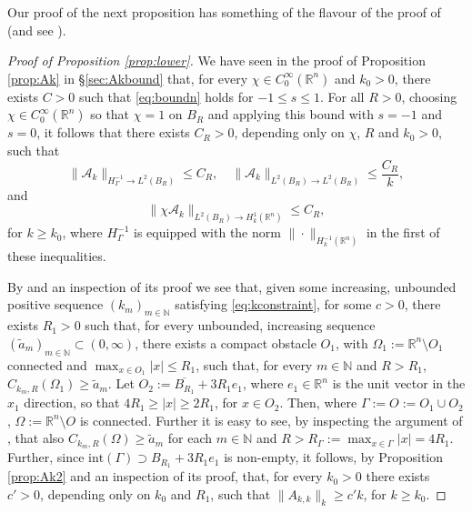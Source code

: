 \documentclass{birkjour}
\theoremstyle{definition}
\theoremstyle{remark}
\numberwithin{equation}{section}
\newcommand{\R}{\mathbb{R}}
\newcommand{\N}{\mathbb{N}}
\newcommand{\cA}{\mathcal{A}}
\begin{document}
Our proof of the next proposition has something of the flavour of the proof of \cite[Theorem 2.8]{BetCha11} (and see \cite[pp.~222--223]{chandler2012numerical}).
\begin{proof}[Proof of Proposition \ref{prop:lower}] We have seen in the proof of Proposition \ref{prop:Ak} in \S\ref{sec:Akbound} that, for every $\chi\in C_0^\infty(\R^n)$ and $k_0>0$, there exists $C>0$ such that \eqref{eq:boundn} holds for $-1\leq s\leq 1$. For all $R>0$,  choosing $\chi\in C^\infty_{0}(\R^n)$ so that $\chi=1$ on $B_R$ and applying this bound with $s=-1$ and $s=0$, it follows that there exists $C_R>0$, depending only on $\chi$, $R$ and $k_0>0$, such that
\begin{equation} \label{eq:Akbounds}
\|\cA_k\|_{H_\Gamma^{-1}\to L^2(B_R)} \leq C_R, \quad \|\cA_k\|_{L^2(B_R)\to L^2(B_R)} \leq \frac{C_R}{k}, 
\end{equation}
and
\begin{equation} \label{eq:Akbounds2}
\|\chi \cA_k\|_{L^2(B_R)\to H_k^1(\R^n)} \leq C_R,
\end{equation}
for $k\geq k_0$, where $H_\Gamma^{-1}$ is equipped with the norm $\|\cdot\|_{H^{-1}_k(\R^n)}$ in the first of these inequalities.


 By \cite[Theorem 1.4]{SiavashSimon0} and an inspection of its proof we see that, given some increasing, unbounded positive sequence $(k_m)_{m\in \N}$  satisfying \eqref{eq:kconstraint}, for some $c>0$, there exists $R_1>0$ such that, for every unbounded, increasing sequence $(\tilde a_m)_{m\in \N}\subset (0,\infty)$, there exists a compact obstacle $O_1$, with $\Omega_1:= \R^n\setminus O_1$ connected and $\max_{x\in O_1}|x|\leq R_1$, such that, for every $m\in \N$ and $R>R_1$,
$
C_{k_m,R}(\Omega_1) \geq \tilde a_m.
$
Let $O_2:= \overline{B_{R_1}} + 3R_1e_1$, where $e_1\in \R^n$ is the unit vector in the $x_1$ direction, so that $4R_1\geq |x| \geq  2R_1$, for $x\in O_2$. Then, where  $\Gamma := O:= O_1\cup O_2$, $\Omega := \R^n\setminus O$ is connected. Further it is easy to see, by inspecting the argument of \cite[Theorem 1.4]{SiavashSimon0}, that also
$ C_{k_m,R}(\Omega)\geq \tilde a_m$ for each $m\in \N$ and $R>R_\Gamma := \max_{x\in \Gamma}|x| = 4R_1$. Further,  since $\mathrm{int}(\Gamma)\supset B_{R_1}+3R_1e_1$ is non-empty, it follows, by Proposition \ref{prop:Ak2} and an inspection of its proof, that, for every $k_0>0$ there exists $c'>0$, depending only on $k_0$ and $R_1$, such that $\|A_{k,k}\|_k\geq c'k$, for $k\geq k_0$. 


\end{proof}
\end{document}
